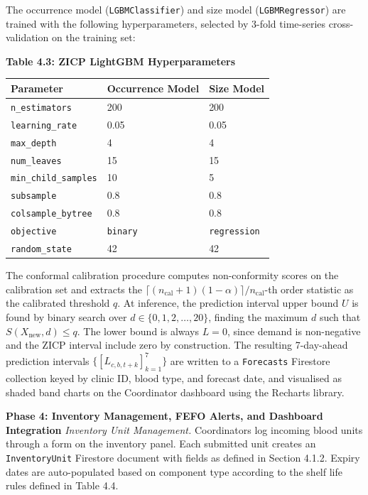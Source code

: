 \documentclass[12pt,a4paper]{article}
\begin{document}
\noindent The occurrence model (\texttt{LGBMClassifier}) and size model (\texttt{LGBMRegressor}) are trained with the following hyperparameters, selected by 3-fold time-series cross-validation on the training set:

\begin{center}
\textbf{Table 4.3: ZICP LightGBM Hyperparameters}
\vspace{0.4em}
\begin{tabular}{lll}
\toprule
\textbf{Parameter} & \textbf{Occurrence Model} & \textbf{Size Model} \\
\midrule
\texttt{n\_estimators} & 200 & 200 \\
\texttt{learning\_rate} & 0.05 & 0.05 \\
\texttt{max\_depth} & 4 & 4 \\
\texttt{num\_leaves} & 15 & 15 \\
\texttt{min\_child\_samples} & 10 & 5 \\
\texttt{subsample} & 0.8 & 0.8 \\
\texttt{colsample\_bytree} & 0.8 & 0.8 \\
\texttt{objective} & \texttt{binary} & \texttt{regression} \\
\texttt{random\_state} & 42 & 42 \\
\bottomrule
\end{tabular}
\end{center}

\noindent The conformal calibration procedure computes non-conformity scores on the calibration set and extracts the $\lceil(n_\text{cal}+1)(1-\alpha)\rceil/n_\text{cal}$-th order statistic as the calibrated threshold $q$. At inference, the prediction interval upper bound $U$ is found by binary search over $d \in \{0, 1, 2, \ldots, 20\}$, finding the maximum $d$ such that $S(X_\text{new}, d) \leq q$. The lower bound is always $L = 0$, since demand is non-negative and the ZICP interval include zero by construction. The resulting 7-day-ahead prediction intervals $\{[L_{c,b,t+k}]_{k=1}^{7}\}$ are written to a \texttt{Forecasts} Firestore collection keyed by clinic ID, blood type, and forecast date, and visualised as shaded band charts on the Coordinator dashboard using the Recharts library.

\noindent\textbf{Phase 4: Inventory Management, FEFO Alerts, and Dashboard Integration}
\noindent\textit{Inventory Unit Management.} Coordinators log incoming blood units through a form on the inventory panel. Each submitted unit creates an \texttt{InventoryUnit} Firestore document with fields as defined in Section 4.1.2. Expiry dates are auto-populated based on component type according to the shelf life rules defined in Table 4.4.
\end{document}

